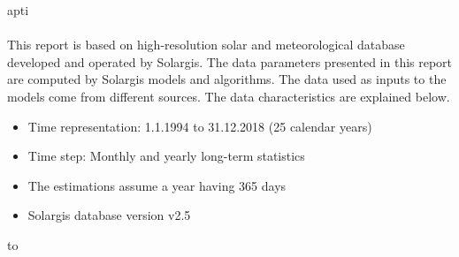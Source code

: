 apti     \documentclass[10pt,a4paper,UTF8]{article}
\begin{document}
{\paragraph{} This report is based on high-resolution solar and meteorological database developed and operated by Solargis. The data parameters presented in this report are computed by Solargis models and algorithms. The data used as inputs to the models come from different sources. The data characteristics are explained below.\begin{itemize}[noitemsep]
\item Time representation: 1.1.1994 to 31.12.2018 (25 calendar years)\item Time step: Monthly and yearly long-term statistics\item The estimations assume a year having 365 days\item Solargis database version v2.5
\end{itemize}%


%


 {\footnotesize 

     \begin{longtabu} to \textwidth{ X[1,L]X[3.3,L]X[1.2,L]X[1,L] }
    
    

\end{longtabu}}}
\end{document}

